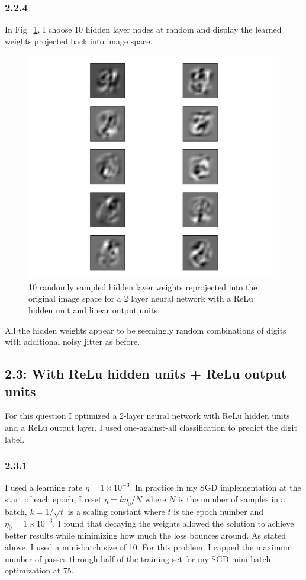 \documentclass[12pt]{amsart}
\begin{document}
\subsubsection*{2.2.4}
In Fig.~\ref{fig:relu_linear_hidden}, I choose 10 hidden layer nodes at random and display the learned weights projected back into image space.
\begin{figure}[H]
	\includegraphics[width=\columnwidth]{relu_linear_hidden.pdf}
    \caption{10 randomly sampled hidden layer weights reprojected into the original image space for a 2 layer neural network with a ReLu hidden unit and linear output units.}
    \label{fig:relu_linear_hidden}
\end{figure}
All the hidden weights appear to be seemingly random combinations of digits with additional noisy jitter as before.

\subsection*{2.3: With ReLu hidden units + ReLu output units}
For this question I optimized a 2-layer neural network with ReLu hidden units and a ReLu output layer.  I used one-against-all classification to predict the digit label.

\subsubsection*{2.3.1}
I used a learning rate $\eta = 1 \times 10^{-3}$.  In practice in my SGD implementation at the start of each epoch, I reset $\eta = k\eta_0/N$ where $N$ is the number of samples in a batch, $k = 1/\sqrt{t}$ is a scaling constant where $t$ is the epoch number and $\eta_0 = 1 \times 10^{-3}$.  I found that decaying the weights allowed the solution to achieve better results while minimizing how much the loss bounces around.   As stated above, I used a mini-batch size of 10.  For this problem, I capped the maximum number of passes through half of the training set for my SGD mini-batch optimization at 75.
\end{document}
